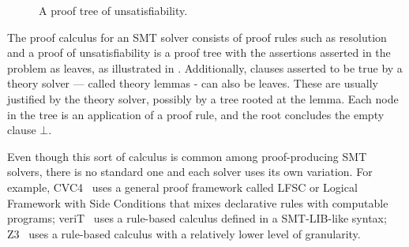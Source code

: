 \documentclass{article}
\begin{document}
		\begin{figure}[t]
			\caption{A proof tree of unsatisfiability.}
			\label{fig:tree}
		\end{figure}

		The proof calculus for an SMT solver consists 
		of proof rules such as resolution and a 
		proof of unsatisfiability is a proof tree with 
		the assertions asserted in the problem as 
		leaves, as illustrated in .
		Additionally, clauses asserted to 
		be true by a theory solver --- called theory lemmas 
		- can also be leaves. These are usually 
		justified by the theory solver, possibly by 
		a tree rooted at the lemma. Each node in 
		the tree is an application of a proof rule, 
		and the root concludes the empty clause $\bot$.
	
		Even though this sort of calculus is common among 
		proof-producing SMT solvers, there is no standard 
		one and each solver uses its own variation.
		For example, CVC4~\cite{DBLP:conf/cav/BarrettCDHJKRT11} 
		uses a general proof framework called LFSC or 
		Logical Framework with Side Conditions
		that mixes declarative rules with computable programs; 
		veriT~\cite{10.1007/978-3-642-02959-2_12} uses a 
		rule-based calculus defined in a 
		SMT-LIB-like syntax; 
		Z3~\cite{10.1007/978-3-540-78800-3_24} uses a 
		rule-based calculus with a relatively lower level 
		of granularity.
	
\end{document}
